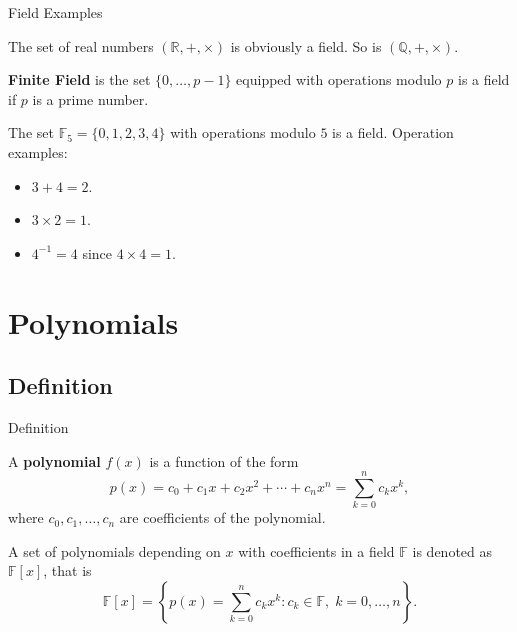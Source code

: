 \documentclass{beamer}
\begin{document}
    \begin{frame}{Field Examples}
      \begin{example}
        The set of real numbers $(\mathbb{R}, +, \times)$ is obviously a field. So is $(\mathbb{Q}, +, \times)$.\pause
    \end{example}

    \begin{definition}
      \textbf{Finite Field} is the set $\{0,\dots,p-1\}$ equipped with operations modulo $p$ is a field if $p$ is a prime number.\pause
    \end{definition}

    \begin{example}
      The set $\mathbb{F}_5 = \{0,1,2,3,4\}$ with operations modulo $5$ is a field. Operation examples:
      \begin{itemize}
        \item $3 + 4 = 2$.
        \item $3 \times 2 = 1$.
        \item $4^{-1} = 4$ since $4 \times 4 = 1$.
      \end{itemize}
    \end{example}
    \end{frame}

    \section{Polynomials}

    \subsection{Definition}

    \begin{frame}{Definition}
      \begin{definition}
        A \textbf{polynomial} $f(x)$ is a function of the form
        \begin{equation*}
            p(x) = c_0 + c_1 x + c_2 x^2 + \cdots + c_n x^n = \sum_{k=0}^{n} c_k x^k,
        \end{equation*}
        where $c_0, c_1, \dots, c_n$ are coefficients of the polynomial.
    \end{definition}
    \pause
    
    \begin{definition}
        A set of polynomials depending on $x$ with coefficients in a field $\mathbb{F}$ is denoted as $\mathbb{F}[x]$, that is
        \begin{equation*}
            \mathbb{F}[x] = \left\{p(x) = \sum_{k=0}^{n} c_k x^k: c_k \in \mathbb{F}, \; k = 0,\dots,n\right\}.
        \end{equation*}
    \end{definition}
    \end{frame}
\end{document}
